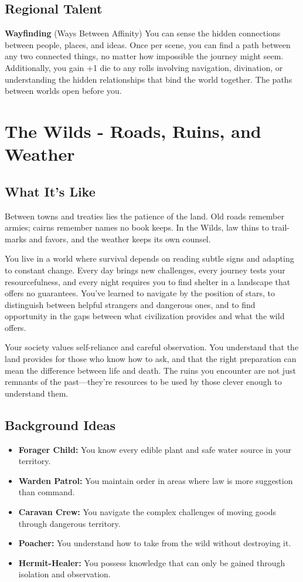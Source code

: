\documentclass[11pt]{article}
\newcommand{\region}[1]{\section*{#1}}
\newcommand{\subregion}[1]{\subsection*{#1}}
\begin{document}
\begin{multicols}{2}
\subregion{Regional Talent}

\textbf{Wayfinding} (Ways Between Affinity)
You can sense the hidden connections between people, places, and ideas. Once per scene, you can find a path between any two connected things, no matter how impossible the journey might seem. Additionally, you gain +1 die to any rolls involving navigation, divination, or understanding the hidden relationships that bind the world together. The paths between worlds open before you.

\end{multicols}

\region{The Wilds - Roads, Ruins, and Weather}

\begin{multicols}{2}
\subregion{What It's Like}

Between towns and treaties lies the patience of the land. Old roads remember armies; cairns remember names no book keeps. In the Wilds, law thins to trail-marks and favors, and the weather keeps its own counsel.

You live in a world where survival depends on reading subtle signs and adapting to constant change. Every day brings new challenges, every journey tests your resourcefulness, and every night requires you to find shelter in a landscape that offers no guarantees. You've learned to navigate by the position of stars, to distinguish between helpful strangers and dangerous ones, and to find opportunity in the gaps between what civilization provides and what the wild offers.

Your society values self-reliance and careful observation. You understand that the land provides for those who know how to ask, and that the right preparation can mean the difference between life and death. The ruins you encounter are not just remnants of the past—they're resources to be used by those clever enough to understand them.

\columnbreak

\subregion{Background Ideas}

\begin{itemize}[leftmargin=*]
    \item \textbf{Forager Child:} You know every edible plant and safe water source in your territory.
    \item \textbf{Warden Patrol:} You maintain order in areas where law is more suggestion than command.
    \item \textbf{Caravan Crew:} You navigate the complex challenges of moving goods through dangerous territory.
    \item \textbf{Poacher:} You understand how to take from the wild without destroying it.
    \item \textbf{Hermit-Healer:} You possess knowledge that can only be gained through isolation and observation.
\end{itemize}


\end{multicols}
\end{document}
